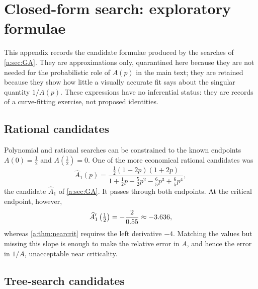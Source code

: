 \section{Closed-form search: exploratory formulae}
\label{a:app:catalogue}

This appendix records the candidate formulae produced by the searches of
\cref{a:sec:GA}. They are approximations only, quarantined here because they are
not needed for the probabilistic role of $A(p)$ in the main text; they are
retained because they show how little a visually accurate fit says about the
singular quantity $1/A(p)$. These expressions have no inferential status: they are
records of a curve-fitting exercise, not proposed identities.

\subsection{Rational candidates}
\label{a:app:rational}

Polynomial and rational searches can be constrained to the known endpoints
$A(0)=\tfrac12$ and $A(\tfrac12)=0$. One of the more economical rational
candidates was
\begin{equation}
\widehat A_1(p)
=
\frac{\tfrac12(1-2p)(1+2p)}
     {1+\tfrac12p-\tfrac52p^2-\tfrac65p^3+\tfrac65p^4} ,
\label{a:eq:Ahat1}
\end{equation}
the candidate $\hat A_1$ of \cref{a:sec:GA}. It passes through both endpoints. At
the critical endpoint, however,
\begin{equation*}
\widehat A_1'\left(\tfrac12\right) = -\frac{2}{0.55}\approx-3.636,
\end{equation*}
whereas \cref{a:thm:nearcrit} requires the left derivative $-4$. Matching the
values but missing this slope is enough to make the relative error in $A$, and
hence the error in $1/A$, unacceptable near criticality.

\subsection{Tree-search candidates}
\label{a:app:treesearch}

